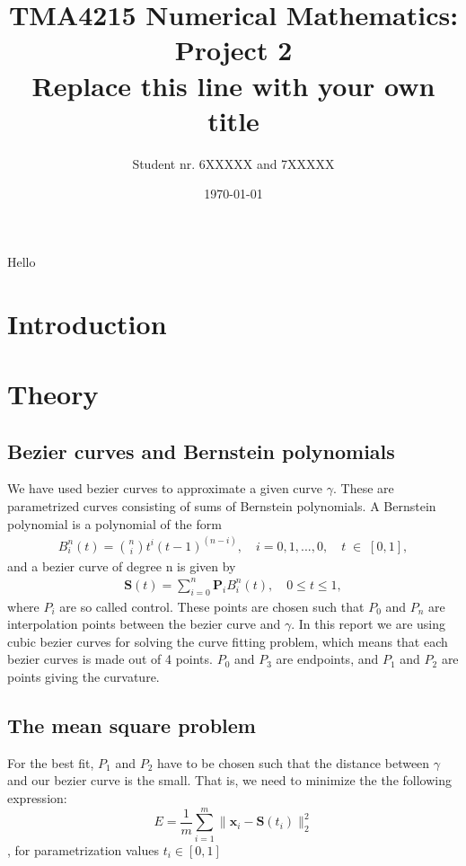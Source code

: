 \documentclass[10pt]{article}
\title{TMA4215 Numerical Mathematics: Project 2 \\ Replace this line with your own title}
\author{Student nr. 6XXXXX and 7XXXXX} %
\date{\today}
\begin{document}
\maketitle
Hello
\begin{abstract}

\end{abstract}

\section{Introduction} 

\section{Theory}

\subsection*{Bezier curves and Bernstein polynomials}

We have used bezier curves to approximate a given curve $\gamma$. These are parametrized curves consisting of sums of Bernstein polynomials. A Bernstein polynomial is a polynomial of the form
\begin{align}
B_{i}^n(t) = \binom{n}{i}t^i(t-1)^{(n-i)},\quad i = 0, 1, ..., 0,\quad t \; \in \; [0,1],
\end{align}
and a bezier curve of degree n is given by
\begin{align}
\mathbf{S}(t) = \sum_{i=0}^{n} \mathbf{P}_i B_{i}^n(t), \quad 0 \leq t \leq 1,
\end{align}
where $P_i$ are so called control. These points are chosen such that $P_0$ and $P_n$ are interpolation points between the bezier curve and $\gamma$. In this report we are using cubic bezier curves for solving the curve fitting problem, which means that each bezier curves is made out of 4 points. $P_0$ and $P_3$ are endpoints, and $P_1$ and $P_2$ are points giving the curvature.

\subsection*{The mean square problem}

For the best fit, $P_1$ and $P_2$ have to be chosen such that the distance between $\gamma$ and our bezier curve is the small. That is, we need to minimize the the following expression:
\begin{equation}
E = \frac{1}{m} \sum_{i=1}^{m} \|\mathbf{x}_i - \mathbf{S}(t_i)\|^2_2
\end{equation},
for parametrization values $t_i \in [0,1]$
\end{document}
